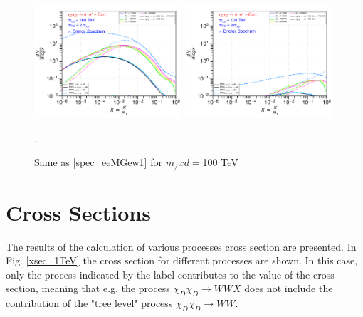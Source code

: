 \documentclass[epj,nopacs,fleqn]{svjour}
\begin{document}
\begin{figure}[!h]
	\subfigure
	{ \includegraphics[width=0.49\textwidth]{Fig/xdxd_ee_eeZ_eveW/100_neutrinos_mu_ee_eeZ_eveW_100.pdf}}
	\subfigure
	{ \includegraphics[width=0.49\textwidth]{Fig/xdxd_ee_eeZ_eveW/100_neutrinos_tau_ee_eeZ_eveW_100.pdf}}
	\caption{Same as \ref{spec_eeMGew1} for  $m_/xd=$100 TeV}.
	\label{spec_eeMGew100}
\end{figure}






\clearpage
\section{Cross Sections}
The results of the calculation of various processes cross section are presented. In Fig. \ref{xsec_1TeV} the cross section for different processes are shown. In this case, only the process indicated by the label contributes to the value of the cross section, meaning that e.g. the process $\chi_D \chi_D \rightarrow WW X$ does not include the contribution of the "tree level" process $\chi_D \chi_D \rightarrow WW$. 
\end{document}
